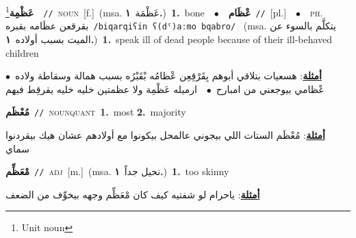 \documentclass[10pt,a4paper,twoside]{article} %
\begin{document}
\begin{multicols}{2}
{\setlength\topsep{0pt}\textbf{\foreignlanguage{arabic}{عَظْمِة}}\footnote{Unit noun}\ \ {\color{gray}\texttt{//}\color{black}}\ \textsc{noun}\ [f.]\ \color{gray}(msa. \foreignlanguage{arabic}{عَظْمَة}~\foreignlanguage{arabic}{\textbf{١.}})\color{black}\ \textbf{1.}~bone\ \ $\bullet$\ \ \setlength\topsep{0pt}\textbf{\foreignlanguage{arabic}{عْظَام}}\ {\color{gray}\texttt{//}\color{black}}\ [pl.]\ \ $\bullet$\ \ \textsc{ph.} \color{gray} \foreignlanguage{arabic}{بقرقعن عظَامه بقبره}\color{black}\ {\color{gray}\texttt{/{\sffamily biqarqiʕin ʕ(dˤ)aːmo bqabro}/}\color{black}}\ \color{gray} (msa. \foreignlanguage{arabic}{يتكلَّم بالسوء عن الميت بسبب أولاده}~\foreignlanguage{arabic}{\textbf{١.}})\color{black}\ \textbf{1.}~speak ill of dead people because of their ill-behaved children\  \begin{flushright}\color{gray}\foreignlanguage{arabic}{\textbf{\underline{\foreignlanguage{arabic}{أمثلة}}}: هسعيات بتلاقي أبوهم بِقَرْقِعِن عْظامُه بْقَبْرُه بسبب همالة وسقاطة ولاده\ $\bullet$\ \  عْظامي بيوجعني من امبارح\ $\bullet$\ \  ارميله عَظْمِة ولا عظمتين خليه خليه يقرقِط فيهم}\end{flushright}\color{black}} \vspace{2mm}

{\setlength\topsep{0pt}\textbf{\foreignlanguage{arabic}{مُعْظَم}}\ {\color{gray}\texttt{//}\color{black}}\ \textsc{noun\textunderscore quant}\ \textbf{1.}~most  \textbf{2.}~majority\  \begin{flushright}\color{gray}\foreignlanguage{arabic}{\textbf{\underline{\foreignlanguage{arabic}{أمثلة}}}: مُعْظَم الستات اللي بيجوني عالمحل بيكونوا مع أولادهم عشان هيك بيقردنوا سماي}\end{flushright}\color{black}} \vspace{2mm}

{\setlength\topsep{0pt}\textbf{\foreignlanguage{arabic}{مْعَظِّم}}\ {\color{gray}\texttt{//}\color{black}}\ \textsc{adj}\ [m.]\ \color{gray}(msa. \foreignlanguage{arabic}{نحيل جداً}~\foreignlanguage{arabic}{\textbf{١.}})\color{black}\ \textbf{1.}~too skinny\  \begin{flushright}\color{gray}\foreignlanguage{arabic}{\textbf{\underline{\foreignlanguage{arabic}{أمثلة}}}: ياحرام لو شفتيه كيف كان مْعَظِّم وجهه بيخوِّف من الضعف}\end{flushright}\color{black}} \vspace{2mm}


\end{multicols}
\end{document}
